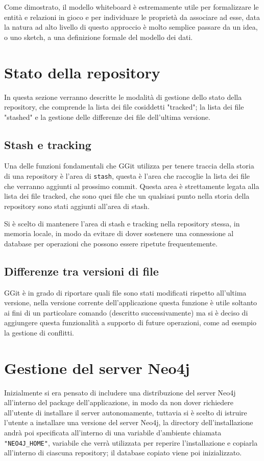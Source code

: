 Come dimostrato, il modello whiteboard è estremamente utile per formalizzare le entità e relazioni in gioco e per individuare le proprietà da associare ad esse, data la natura ad alto livello di questo approccio è molto semplice passare da un idea, o uno sketch, a una definizione formale del modello dei dati.
\section{Stato della repository}
\label{sec:stato}
In questa sezione verranno descritte le modalità di gestione dello stato della repository, che comprende la lista dei file cosiddetti "tracked"; la lista dei file "stashed" e la gestione delle differenze dei file dell'ultima versione.

\subsection{Stash e tracking}
\label{subsec:stash}
Una delle funzioni fondamentali che GGit utilizza per tenere traccia della storia di una repository è l'area di \texttt{stash}, questa è l'area che raccoglie la lista dei file che verranno aggiunti al prossimo commit.
Questa area è strettamente legata alla lista dei file tracked, che sono quei file che un qualsiasi punto nella storia della repository sono stati aggiunti all'area di stash.

Si è scelto di mantenere l'area di stash e tracking nella repository stessa, in memoria locale, in modo da evitare di dover sostenere una connessione al database per operazioni che possono essere ripetute frequentemente.

\subsection{Differenze tra versioni di file}
\label{subsec:differenze}
GGit è in grado di riportare quali file sono stati modificati rispetto all'ultima versione, nella versione corrente dell'applicazione questa funzione è utile soltanto ai fini di un particolare comando (descritto successivamente) ma si è deciso di aggiungere questa funzionalità a supporto di future operazioni, come ad esempio la gestione di conflitti.

\section{Gestione del server Neo4j}
Inizialmente si era pensato di includere una distribuzione del server Neo4j all'interno del package dell'applicazione, in modo da non dover richiedere all'utente di installare il server autonomamente, tuttavia si è scelto di istruire l'utente a installare una versione del server Neo4j, la directory dell'installazione andrà poi specificata all'interno di una variabile d'ambiente chiamata \texttt{"NEO4J\_HOME"}, variabile che verrà utilizzata per reperire l'installazione e copiarla all'interno di ciascuna repository; il database copiato viene poi inizializzato.

